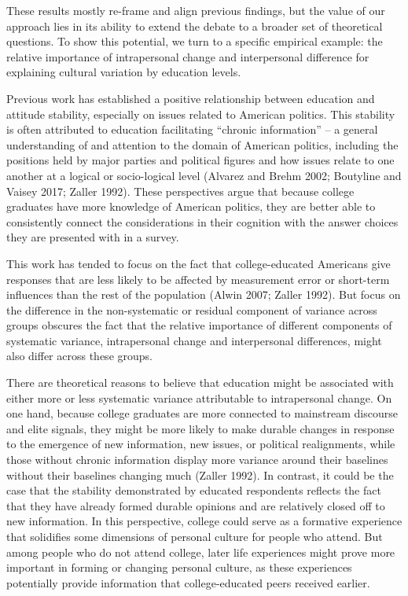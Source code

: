 \documentclass[
  12pt,
]{article}
\begin{document}
These results mostly re-frame and align previous findings, but the value
of our approach lies in its ability to extend the debate to a broader
set of theoretical questions. To show this potential, we turn to a
specific empirical example: the relative importance of intrapersonal
change and interpersonal difference for explaining cultural variation by
education levels.

Previous work has established a positive relationship between education
and attitude stability, especially on issues related to American
politics. This stability is often attributed to education facilitating
``chronic information'' -- a general understanding of and attention to
the domain of American politics, including the positions held by major
parties and political figures and how issues relate to one another at a
logical or socio-logical level (Alvarez and Brehm 2002; Boutyline and
Vaisey 2017; Zaller 1992). These perspectives argue that because college
graduates have more knowledge of American politics, they are better able
to consistently connect the considerations in their cognition with the
answer choices they are presented with in a survey.

This work has tended to focus on the fact that college-educated
Americans give responses that are less likely to be affected by
measurement error or short-term influences than the rest of the
population (Alwin 2007; Zaller 1992). But focus on the difference in the
non-systematic or residual component of variance across groups obscures
the fact that the relative importance of different components of
systematic variance, intrapersonal change and interpersonal differences,
might also differ across these groups.

There are theoretical reasons to believe that education might be
associated with either more or less systematic variance attributable to
intrapersonal change. On one hand, because college graduates are more
connected to mainstream discourse and elite signals, they might be more
likely to make durable changes in response to the emergence of new
information, new issues, or political realignments, while those without
chronic information display more variance around their baselines without
their baselines changing much (Zaller 1992). In contrast, it could be
the case that the stability demonstrated by educated respondents
reflects the fact that they have already formed durable opinions and are
relatively closed off to new information. In this perspective, college
could serve as a formative experience that solidifies some dimensions of
personal culture for people who attend. But among people who do not
attend college, later life experiences might prove more important in
forming or changing personal culture, as these experiences potentially
provide information that college-educated peers received earlier.
\end{document}
